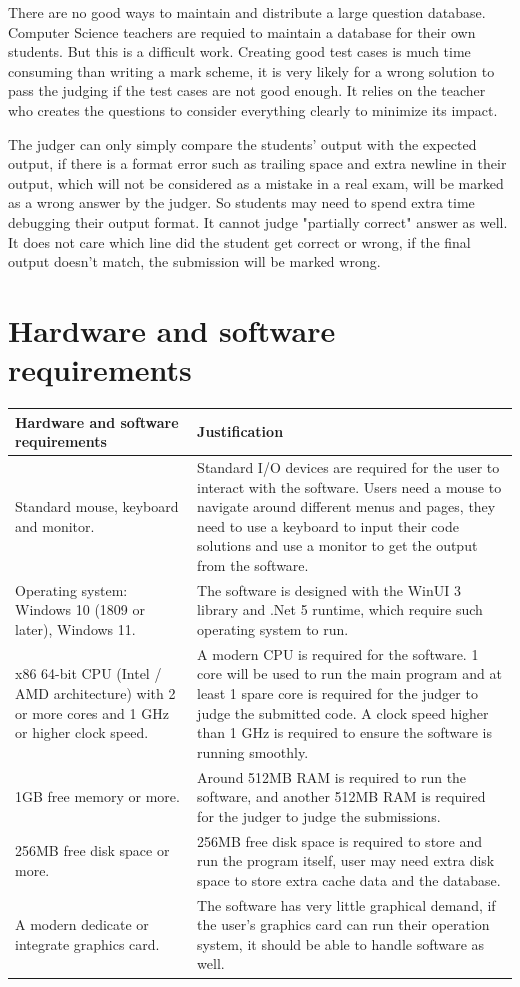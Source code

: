 \documentclass[a4paper]{report}
\begin{document}
There are no good ways to maintain and distribute a large question database. Computer Science teachers are requied to maintain a database for their own students. But this is a difficult work. Creating good test cases is much time consuming than writing a mark scheme, it is very likely for a wrong solution to pass the judging if the test cases are not good enough. It relies on the teacher who creates the questions to consider everything clearly to minimize its impact.

The judger can only simply compare the students' output with the expected output, if there is a format error such as trailing space and extra newline in their output, which will not be considered as a mistake in a real exam, will be marked as a wrong answer by the judger. So students may need to spend extra time debugging their output format. It cannot judge "partially correct" answer as well. It does not care which line did the student get correct or wrong, if the final output doesn't match, the submission will be marked wrong. 

\section{Hardware and software requirements}

\begin{tabulary}{\linewidth}{|L|L|}
    \hline
    Hardware and software requirements & Justification \\
    \hline
    Standard mouse, keyboard and monitor. & Standard I/O devices are required for the user to interact with the software. Users need a mouse to navigate around different menus and pages, they need to use a keyboard to input their code solutions and use a monitor to get the output from the software. \\
    \hline
    Operating system: Windows 10 (1809 or later), Windows 11. & The software is designed with the WinUI 3 library and .Net 5 runtime, which require such operating system to run. \\
    \hline
    x86 64-bit CPU (Intel / AMD architecture) with 2 or more cores and 1 GHz or higher clock speed. & A modern CPU is required for the software. 1 core will be used to run the main program and at least 1 spare core is required for the judger to judge the submitted code. A clock speed higher than 1 GHz is required to ensure the software is running smoothly. \\
    \hline
    1GB free memory or more. & Around 512MB RAM is required to run the software, and another 512MB RAM is required for the judger to judge the submissions. \\
    \hline
    256MB free disk space or more. & 256MB free disk space is required to store and run the program itself, user may need extra disk space to store extra cache data and the database. \\
    \hline
    A modern dedicate or integrate graphics card. & The software has very little graphical demand, if the user's graphics card can run their operation system, it should be able to handle software as well. \\
    \hline
\end{tabulary}
\end{document}
